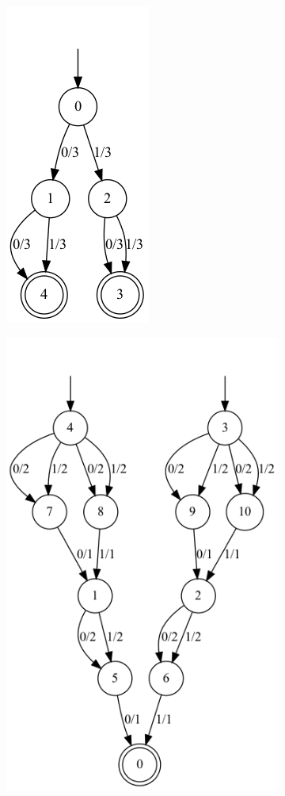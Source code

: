 \begin{figure}[h]
    \centering
    \begin{subfigure}{.2\textwidth}
        \centering
        \includegraphics[scale=0.3]{obrazky-figures/revert_img1.png}
        \caption{}
        \label{revert_img1}
    \end{subfigure}
    \hfil
    \begin{subfigure}{.4\textwidth}
        \centering
        \includegraphics[scale=0.3]{obrazky-figures/revert_img2.png}

\end{subfigure}
\end{figure}
